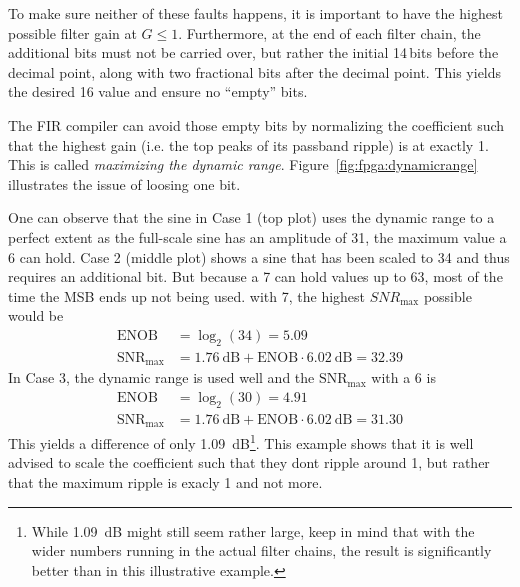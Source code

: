 To make  sure neither  of these faults  happens, it is  important to  have the
highest possible  filter gain at $G  \leq 1$. Furthermore, at the  end of each
filter chain,  the additional bits  must not be  carried over, but  rather the
initial \num{14}\,bits  before the  decimal point,  along with  two fractional
bits after the decimal point. This  yields the desired \SI{16}{\bit} value and
ensure no ``empty'' bits.

The FIR  compiler can avoid  those empty  bits by normalizing  the coefficient
such  that the  highest  gain (i.e.  the  top peaks  of  its passband  ripple)
is  at  exactly   \num{1}.   This  is  called   \emph{maximizing  the  dynamic
range}. Figure~\ref{fig:fpga:dynamicrange}  illustrates the  issue of  loosing
one bit.

One can  observe that  the sine in  Case \num{1} (top  plot) uses  the dynamic
range to a perfect extent as the full-scale sine has an amplitude of \num{31},
the maximum  value a \SI{6}{\bit}   can hold. Case  \num{2} (middle
plot) shows  a sine  that has  been scaled  to \num{34}  and thus  requires an
additional bit.  But  because a \SI{7}{\bit}  can hold  values up to
\num{63}, most of the time the MSB  ends up not being used. with \SI{7}{\bit},
the highest $SNR_\mathrm{max}$ possible would be
\begin{align}
    \mathrm{ENOB}             &= \log_2(34) = 5.09 \nonumber \\
    \mathrm{SNR}_\mathrm{max} &= \SI{1.76}{\dB} + \mathrm{ENOB} \cdot \SI{6.02}{\dB} = 32.39
\end{align}
In   Case    \num{3},   the   dynamic    range   is   used   well    and   the
$\mathrm{SNR}_\mathrm{max}$ with a \SI{6}{\bit}  is
\begin{align}
    \mathrm{ENOB}             &= \log_2(30)  = 4.91 \nonumber\\
    \mathrm{SNR}_\mathrm{max} &= \SI{1.76}{\dB} + \mathrm{ENOB} \cdot \SI{6.02}{\dB} = 31.30
\end{align}
This yields a difference of only \SI{1.09}{\dB}\footnote{%
    While \SI{1.09}{\dB} might still seem rather large, keep in mind that with
    the  wider numbers  running in  the actual  filter chains,  the result  is
    significantly better than in this illustrative example.%
}.
This example shows that it is well  advised to scale the coefficient such that
they dont ripple around \num{1}, but  rather that the maximum ripple is exacly
\num{1} and not more.

